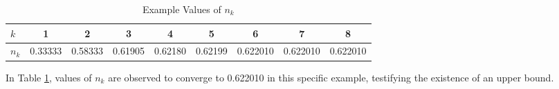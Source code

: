 	\begin{table}[H]
		\centering
            \caption{Example Values of $n_k$}
            \label{example_values_n_k}
		\begin{tabular}{lcccccccc}
                \hline
                \hline
			$k$	& 1 & 2 & 3 & 4 & 5 & 6 & 7 & 8 \\
                \hline
			$n_k$ & 0.33333 & 0.58333 & 0.61905 & 0.62180 & 0.62199 & 0.622010 & 0.622010 & 0.622010\\
			\hline
                \hline
		\end{tabular}
	\end{table}
        
        In Table \ref{example_values_n_k}, values of $n_k$ are observed to converge to 0.622010 in this specific example, testifying the existence of an upper bound.

    \newpage
